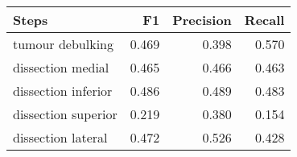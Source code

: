\begin{tabular}{lrrr}
\toprule
Steps & F1 & Precision & Recall \\
\midrule
tumour debulking & 0.469 & 0.398 & 0.570 \\
dissection medial & 0.465 & 0.466 & 0.463 \\
dissection inferior & 0.486 & 0.489 & 0.483 \\
dissection superior & 0.219 & 0.380 & 0.154 \\
dissection lateral & 0.472 & 0.526 & 0.428 \\
\bottomrule
\end{tabular}
